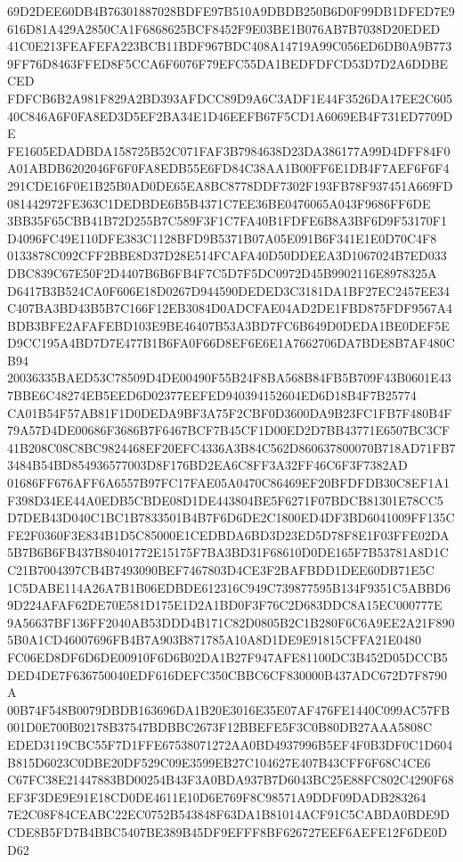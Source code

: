 \documentclass[UTF8,fontset=fandol,zihao=-4,a4paper]{ctexart}
\begin{document}
{{69D2DEE60DB4B76301887028BDFE97B510A9DBDB250B6D0F99DB1DFED7E9616D81A429A2850CA1F6868625BCF8452F9E03BE1B076AB7B7038D20EDED
41C0E213FEAFEFA223BCB11BDF967BDC408A14719A99C056ED6DB0A9B7739FF76D8463FFED8F5CCA6F6076F79EFC55DA1BEDFDFCD53D7D2A6DDBECED
FDFCB6B2A981F829A2BD393AFDCC89D9A6C3ADF1E44F3526DA17EE2C60540C846A6F0FA8ED3D5EF2BA34E1D46EEFB67F5CD1A6069EB4F731ED7709DE
FE1605EDADBDA158725B52C071FAF3B7984638D23DA386177A99D4DFF84F0A01ABDB6202046F6F0FA8EDB55E6FD84C38AA1B00FF6E1DB4F7AEF6F6F4
291CDE16F0E1B25B0AD0DE65EA8BC8778DDF7302F193FB78F937451A669FD081442972FE363C1DEDBDE6B5B4371C7EE36BE0476065A043F9686FF6DE
3BB35F65CBB41B72D255B7C589F3F1C7FA40B1FDFE6B8A3BF6D9F53170F1D4096FC49E110DFE383C1128BFD9B5371B07A05E091B6F341E1E0D70C4F8
0133878C092CFF2BBE8D37D28E514FCAFA40D50DDEEA3D1067024B7ED033DBC839C67E50F2D4407B6B6FB4F7C5D7F5DC0972D45B9902116E8978325A
D6417B3B524CA0F606E18D0267D944590DEDED3C3181DA1BF27EC2457EE34C407BA3BD43B5B7C166F12EB3084D0ADCFAE04AD2DE1FBD875FDF9567A4
BDB3BFE2AFAFEBD103E9BE46407B53A3BD7FC6B649D0DEDA1BE0DEF5ED9CC195A4BD7D7E477B1B6FA0F66D8EF6E6E1A7662706DA7BDE8B7AF480CB94
20036335BAED53C78509D4DE00490F55B24F8BA568B84FB5B709F43B0601E437BBE6C48274EB5EED6D02377EEFED940394152604ED6D18B4F7B25774
CA01B54F57AB81F1D0DEDA9BF3A75F2CBF0D3600DA9B23FC1FB7F480B4F79A57D4DE00686F3686B7F6467BCF7B45CF1D00ED2D7BB43771E6507BC3CF
41B208C08C8BC9824468EF20EFC4336A3B84C562D860637800070B718AD71FB73484B54BD854936577003D8F176BD2EA6C8FF3A32FF46C6F3F7382AD
01686FF676AFF6A6557B97FC17FAE05A0470C86469EF20BFDFDB30C8EF1A1F398D34EE44A0EDB5CBDE08D1DE443804BE5F6271F07BDCB81301E78CC5
D7DEB43D040C1BC1B7833501B4B7F6D6DE2C1800ED4DF3BD6041009FF135CFE2F0360F3E834B1D5C85000E1CEDBDA6BD3D23ED5D78F8E1F03FFE02DA
5B7B6B6FB437B80401772E15175F7BA3BD31F68610D0DE165F7B53781A8D1CC21B7004397CB4B7493090BEF7467803D4CE3F2BAFBDD1DEE60DB71E5C
1C5DABE114A26A7B1B06EDBDE612316C949C739877595B134F9351C5ABBD69D224AFAF62DE70E581D175E1D2A1BD0F3F76C2D683DDC8A15EC000777E
9A56637BF136FF2040AB53DDD4B171C82D0805B2C1B280F6C6A9EE2A21F8905B0A1CD46007696FB4B7A903B871785A10A8D1DE9E91815CFFA21E0480
FC06ED8DF6D6DE00910F6D6B02DA1B27F947AFE81100DC3B452D05DCCB5DED4DE7F636750040EDF616DEFC350CBBC6CF830000B437ADC672D7F8790A
00B74F548B0079DBDB163696DA1B20E3016E35E07AF476FE1440C099AC57FB001D0E700B02178B37547BDBBC2673F12BBEFE5F3C0B80DB27AAA5808C
EDED3119CBC55F7D1FFE67538071272AA0BD4937996B5EF4F0B3DF0C1D604B815D6023C0DBE20DF529C09E3599EB27C104627E407B43CFF6F68C4CE6
C67FC38E21447883BD00254B43F3A0BDA937B7D6043BC25E88FC802C4290F68EF3F3DE9E91E18CD0DE4611E10D6E769F8C98571A9DDF09DADB283264
7E2C08F84CEABC22EC0752B543848F63DA1B81014ACF91C5CABDA0BDE9DCDE8B5FD7B4BBC5407BE389B45DF9EFFF8BF626727EEF6AEFE12F6DE0DD62
}}
\end{document}
